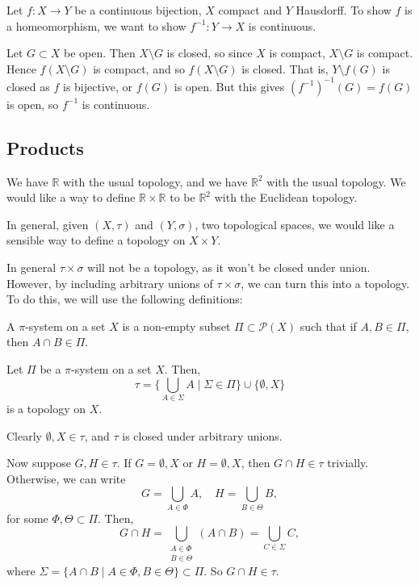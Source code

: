 \documentclass[12pt]{article}
\begin{document}
\begin{proofbox}
	Let $f : X \to Y$ be a continuous bijection, $X$ compact and $Y$ Hausdorff. To show $f$ is a homeomorphism, we want to show $f^{-1} : Y \to X$ is continuous.

	Let $G \subset X$ be open. Then $X \setminus G$ is closed, so since $X$ is compact, $X \setminus G$ is compact. Hence $f(X \setminus G)$ is compact, and so $f(X \setminus G)$ is closed. That is, $Y \setminus f(G)$ is closed as $f$ is bijective, or $f(G)$ is open. But this gives $(f^{-1})^{-1}(G) = f(G)$ is open, so $f^{-1}$ is continuous.
\end{proofbox}

\subsection{Products}%
\label{sub:products}

We have $\mathbb{R}$ with the usual topology, and we have $\mathbb{R}^2$ with the usual topology. We would like a way to define $\mathbb{R} \times \mathbb{R}$ to be $\mathbb{R}^2$ with the Euclidean topology.

In general, given $(X, \tau)$ and $(Y, \sigma)$, two topological spaces, we would like a sensible way to define a topology on $X \times Y$.

In general $\tau \times \sigma$ will not be a topology, as it won't be closed under union. However, by including arbitrary unions of $\tau \times \sigma$, we can turn this into a topology. To do this, we will use the following definitions:

\begin{definition}
	A $\pi$-system on a set $X$ is a non-empty subset $\Pi \subset \mathcal{P}(X)$ such that if $A, B \in \Pi$, then $A \cap B \in \Pi$.
\end{definition}

\begin{proposition}
	Let $\Pi$ be a $\pi$-system on a set $X$. Then,
	\[
		\tau = \Biggl\{ \bigcup_{A \in \Sigma} A \mid \Sigma \in \Pi \Biggr\} \cup \{\emptyset, X\}
	\]
	is a topology on $X$.
\end{proposition}

\begin{proofbox}
	Clearly $\emptyset, X \in \tau$, and $\tau$ is closed under arbitrary unions.

	Now suppose $G, H \in \tau$. If $G = \emptyset, X$ or $H = \emptyset, X$, then $G \cap H \in \tau$ trivially. Otherwise, we can write
	\[
	G = \bigcup_{A \in \Phi} A, \quad H = \bigcup_{B \in \Theta}B
	,\]
	for some $\Phi, \Theta \subset \Pi$. Then,
	\[
		G \cap H = \bigcup_{\substack{A \in \Phi \\ B \in \Theta}} (A \cap B) = \bigcup_{C \in \Sigma} C
	,\]
	where $\Sigma = \{A \cap B \mid A \in \Phi, B \in \Theta\} \subset \Pi$. So $G \cap H \in \tau$.
\end{proofbox}
\end{document}
